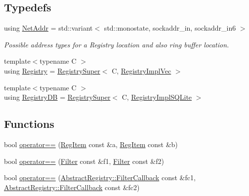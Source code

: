 \subsection*{Typedefs}
\begin{DoxyCompactItemize}
\item 
using \hyperlink{namespaceregistry_a2d7eac31eb792025667bcebdfe93dbf2}{Net\+Addr} = std\+::variant$<$ std\+::monostate, sockaddr\+\_\+in, sockaddr\+\_\+in6 $>$
\begin{DoxyCompactList}\small\item\em Possible address types for a Registry location and also ring buffer location. \end{DoxyCompactList}\item 
{\footnotesize template$<$typename C $>$ }\\using \hyperlink{namespaceregistry_acde3104226ae0b7a590efe949ddec8e2}{Registry} = \hyperlink{classregistry_1_1RegistrySuper}{Registry\+Super}$<$ C, \hyperlink{classregistry_1_1RegistryImplVec}{Registry\+Impl\+Vec} $>$
\item 
{\footnotesize template$<$typename C $>$ }\\using \hyperlink{namespaceregistry_a6cd2ff083e7825c966c206645cafcc0f}{Registry\+DB} = \hyperlink{classregistry_1_1RegistrySuper}{Registry\+Super}$<$ C, \hyperlink{classregistry_1_1RegistryImplSQLite}{Registry\+Impl\+S\+Q\+Lite} $>$
\end{DoxyCompactItemize}
\subsection*{Functions}
\begin{DoxyCompactItemize}
\item 
bool \hyperlink{namespaceregistry_a3aea015bffedea5734787cec200bfe1b}{operator==} (\hyperlink{classregistry_1_1RegItem}{Reg\+Item} const \&a, \hyperlink{classregistry_1_1RegItem}{Reg\+Item} const \&b)
\item 
bool \hyperlink{namespaceregistry_af536cbf7e20589d15ebaef7741b96442}{operator==} (\hyperlink{classregistry_1_1Filter}{Filter} const \&f1, \hyperlink{classregistry_1_1Filter}{Filter} const \&f2)
\item 
bool \hyperlink{namespaceregistry_ab4ecf4356115299551ca38f2f3cf15e1}{operator==} (\hyperlink{classregistry_1_1AbstractRegistry_a31f6bef634dcd324efebaf55f99b950f}{Abstract\+Registry\+::\+Filter\+Callback} const \&fc1, \hyperlink{classregistry_1_1AbstractRegistry_a31f6bef634dcd324efebaf55f99b950f}{Abstract\+Registry\+::\+Filter\+Callback} const \&fc2)
\end{DoxyCompactItemize}


